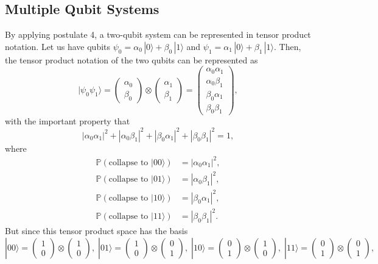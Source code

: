 \documentclass{article}
\theoremstyle{definition}
\begin{document}
\subsection*{Multiple Qubit Systems}
By applying postulate 4, a two-qubit system can be represented in tensor product notation. Let us have qubits $\psi_0 = \alpha_0 \, |0\rangle + \beta_0 \, |1\rangle$ and $\psi_1 = \alpha_1 \, |0\rangle + \beta_1 \, |1\rangle$. Then, the tensor product notation of the two qubits can be represented as
\[|\psi_0 \psi_1 \rangle = \begin{pmatrix} \alpha_0 \\ \beta_0 \end{pmatrix} \otimes \begin{pmatrix} \alpha_1 \\ \beta_1 \end{pmatrix} = \begin{pmatrix} \alpha_0 \alpha_1 \\ \alpha_0 \beta_1 \\ \beta_0 \alpha_1 \\ \beta_0 \beta_1 \end{pmatrix},\]
with the important property that
\[|\alpha_0 \alpha_1|^2 + |\alpha_0 \beta_1|^2 + |\beta_0 \alpha_1|^2 + |\beta_0 \beta_1|^2 = 1,\]
where
\begin{align*}
  \mathbb{P}(\text{collapse to } |00\rangle) & = |\alpha_0 \alpha_1|^2, \\
  \mathbb{P}(\text{collapse to } |01\rangle) & = |\alpha_0 \beta_1|^2, \\
  \mathbb{P}(\text{collapse to } |10\rangle) & = |\beta_0 \alpha_1|^2, \\
  \mathbb{P}(\text{collapse to } |11\rangle) & = |\beta_0 \beta_1|^2.
\end{align*}
But since this tensor product space has the basis
\[|00\rangle = \begin{pmatrix} 1 \\ 0 \end{pmatrix} \otimes \begin{pmatrix} 1 \\ 0 \end{pmatrix}, \; 
|01\rangle = \begin{pmatrix} 1 \\ 0 \end{pmatrix} \otimes \begin{pmatrix} 0 \\ 1 \end{pmatrix}, \; 
|10\rangle = \begin{pmatrix} 0 \\ 1 \end{pmatrix} \otimes \begin{pmatrix} 1 \\ 0 \end{pmatrix}, \; 
|11\rangle = \begin{pmatrix} 0 \\ 1 \end{pmatrix} \otimes \begin{pmatrix} 0 \\ 1 \end{pmatrix},\]
\end{document}
